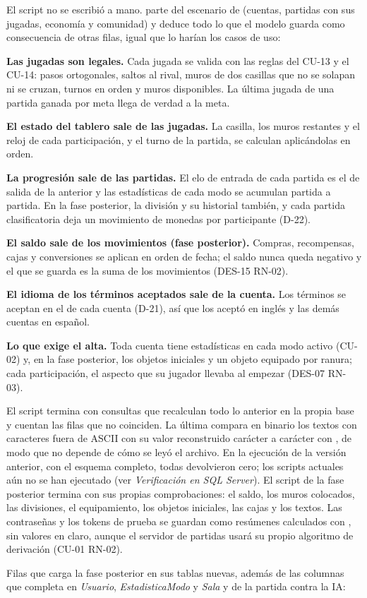 El script no se escribió a mano.  parte del escenario de  (cuentas, partidas con sus jugadas, economía y comunidad) y deduce todo lo que el modelo guarda como consecuencia de otras filas, igual que lo harían los casos de uso:

\begin{reglas}
  \item \textbf{Las jugadas son legales.} Cada jugada se valida con las reglas del \mbox{CU-13} y el \mbox{CU-14}: pasos ortogonales, saltos al rival, muros de dos casillas que no se solapan ni se cruzan, turnos en orden y muros disponibles. La última jugada de una partida ganada por meta llega de verdad a la meta.
  \item \textbf{El estado del tablero sale de las jugadas.} La casilla, los muros restantes y el reloj de cada participación, y el turno de la partida, se calculan aplicándolas en orden.
  \item \textbf{La progresión sale de las partidas.} El elo de entrada de cada partida es el de salida de la anterior y las estadísticas de cada modo se acumulan partida a partida. En la fase posterior, la división y su historial también, y cada partida clasificatoria deja un movimiento de monedas por participante (\mbox{D-22}).
  \item \textbf{El saldo sale de los movimientos (fase posterior).} Compras, recompensas, cajas y conversiones se aplican en orden de fecha; el saldo nunca queda negativo y el que se guarda es la suma de los movimientos (\mbox{DES-15} \mbox{RN-02}).
  \item \textbf{El idioma de los términos aceptados sale de la cuenta.} Los términos se aceptan en el  de cada cuenta (\mbox{D-21}), así que  los aceptó en inglés y las demás cuentas en español.
  \item \textbf{Lo que exige el alta.} Toda cuenta tiene estadísticas en cada modo activo (\mbox{CU-02}) y, en la fase posterior, los objetos iniciales y un objeto equipado por ranura; cada participación, el aspecto que su jugador llevaba al empezar (\mbox{DES-07} \mbox{RN-03}).
\end{reglas}

El script termina con \dpNumComprobaciones{} consultas que recalculan todo lo anterior en la propia base y cuentan las filas que no coinciden. La última compara en binario los \dpNumTextosUnicode{} textos con caracteres fuera de ASCII con su valor reconstruido carácter a carácter con , de modo que no depende de cómo se leyó el archivo. En la ejecución de la versión anterior, con el esquema completo, todas devolvieron cero; los scripts actuales aún no se han ejecutado (ver \textit{Verificación en SQL Server}). El script de la fase posterior termina con sus propias \dpFpNumComprobaciones{} comprobaciones: el saldo, los muros colocados, las divisiones, el equipamiento, los objetos iniciales, las cajas y los textos. Las contraseñas y los tokens de prueba se guardan como resúmenes calculados con , sin valores en claro, aunque el servidor de partidas usará su propio algoritmo de derivación (\mbox{CU-01} \mbox{RN-02}).



Filas que carga la fase posterior en sus tablas nuevas, además de las columnas que completa en \textit{Usuario}, \textit{EstadisticaModo} y \textit{Sala} y de la partida contra la IA:


